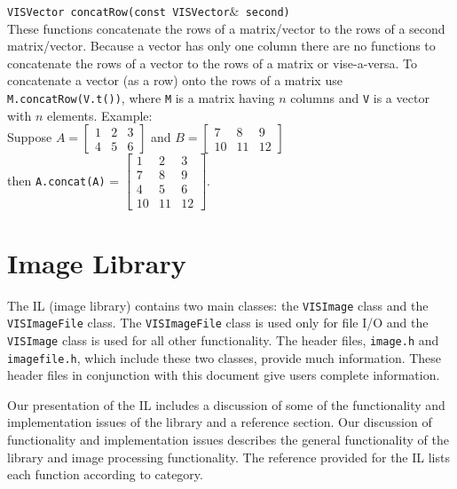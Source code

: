 \begin{description}
{\tt VISVector concatRow(const VISVector$\&$ second)}\\
These functions concatenate the rows of a matrix/vector to the rows
of a second matrix/vector.
Because a vector has only one column there are no functions to concatenate
the rows of a vector to the rows of a matrix or vise-a-versa.
To concatenate a vector (as a row) onto the rows of a matrix use
{\tt M.concatRow(V.t())}, where {\tt M} is a matrix having $n$ columns
and {\tt V} is a vector with $n$ elements.
Example:\\
Suppose
$A = \left[ \begin{array}{ccc} 1 & 2 & 3\\4 &5 & 6\end{array} \right]$
and
$B = \left[ \begin{array}{ccc} 7 & 8 & 9\\10 &11 & 12\end{array} \right]$\\
\vspace*{0.25in}
then {\tt A.concat(A)} = $\left[ \begin{array}{ccc}
1 & 2 & 3 \\ 7 & 8 & 9\\
4 & 5 & 6 \\ 10 & 11 & 12 \end{array} \right]$.
\end{description}

\section{Image Library}
The IL (image library) contains two main classes: the {\tt VISImage} class
and the {\tt VISImageFile} class.
The {\tt VISImageFile} class is used only for file I/O and 
the {\tt VISImage} class is used for all other functionality.
The header files, {\tt image.h} and {\tt imagefile.h}, which include
these two classes, provide much information.
These header files in conjunction with this document give
users complete information.

Our presentation of the IL includes a discussion of
some of the functionality and implementation issues of the
library and a reference section.  Our discussion of 
functionality and implementation issues describes the
general functionality of the library and image processing
functionality.  The reference provided for the IL lists
each function according to category.

